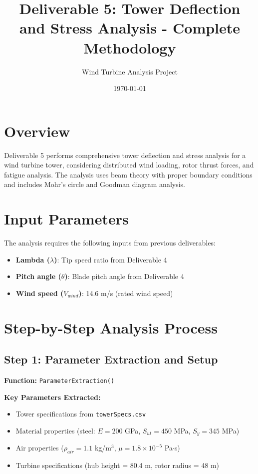 \documentclass[11pt]{article}
\title{Deliverable 5: Tower Deflection and Stress Analysis - Complete Methodology}
\author{Wind Turbine Analysis Project}
\date{\today}
\begin{document}
\maketitle

\section{Overview}
Deliverable 5 performs comprehensive tower deflection and stress analysis for a wind turbine tower, considering distributed wind loading, rotor thrust forces, and fatigue analysis. The analysis uses beam theory with proper boundary conditions and includes Mohr's circle and Goodman diagram analysis.

\section{Input Parameters}
The analysis requires the following inputs from previous deliverables:
\begin{itemize}
    \item \textbf{Lambda ($\lambda$)}: Tip speed ratio from Deliverable 4
    \item \textbf{Pitch angle ($\theta$)}: Blade pitch angle from Deliverable 4
    \item \textbf{Wind speed ($V_{wind}$)}: 14.6 m/s (rated wind speed)
\end{itemize}

\section{Step-by-Step Analysis Process}

\subsection{Step 1: Parameter Extraction and Setup}
\textbf{Function:} \texttt{ParameterExtraction()}

\textbf{Key Parameters Extracted:}
\begin{itemize}
    \item Tower specifications from \texttt{towerSpecs.csv}
    \item Material properties (steel: $E = 200$ GPa, $S_{ut} = 450$ MPa, $S_y = 345$ MPa)
    \item Air properties ($\rho_{air} = 1.1$ kg/m$^3$, $\mu = 1.8 \times 10^{-5}$ Pa$\cdot$s)
    \item Turbine specifications (hub height = 80.4 m, rotor radius = 48 m)
\end{itemize}
\end{document}
